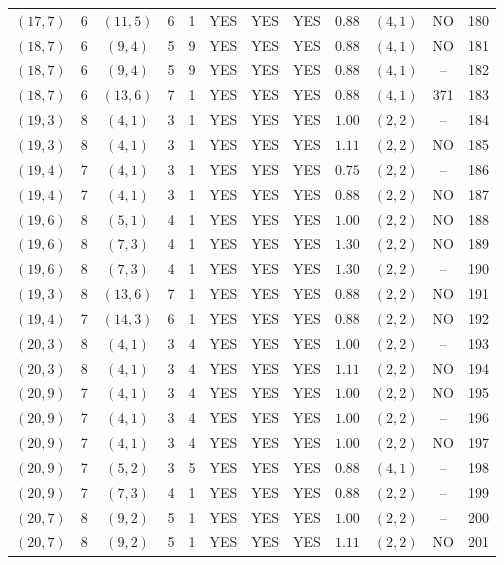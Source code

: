 \begin{longtable}{|c|c|c|c|c|c|c|c|c|c|c|c|}
$(17,7)$ & 6 & $(11,5)$ & 6 & 1 & YES & YES & YES & $0.88$ & $(4,1)$ & NO & 180\\
$(18,7)$ & 6 & $(9,4)$ & 5 & 9 & YES & YES & YES & $0.88$ & $(4,1)$ & NO & 181\\
$(18,7)$ & 6 & $(9,4)$ & 5 & 9 & YES & YES & YES & $0.88$ & $(4,1)$ & -- & 182\\
$(18,7)$ & 6 & $(13,6)$ & 7 & 1 & YES & YES & YES & $0.88$ & $(4,1)$ & 371 & 183\\
$(19,3)$ & 8 & $(4,1)$ & 3 & 1 & YES & YES & YES & $1.00$ & $(2,2)$ & -- & 184\\
$(19,3)$ & 8 & $(4,1)$ & 3 & 1 & YES & YES & YES & $1.11$ & $(2,2)$ & NO & 185\\
$(19,4)$ & 7 & $(4,1)$ & 3 & 1 & YES & YES & YES & $0.75$ & $(2,2)$ & -- & 186\\
$(19,4)$ & 7 & $(4,1)$ & 3 & 1 & YES & YES & YES & $0.88$ & $(2,2)$ & NO & 187\\
$(19,6)$ & 8 & $(5,1)$ & 4 & 1 & YES & YES & YES & $1.00$ & $(2,2)$ & NO & 188\\
$(19,6)$ & 8 & $(7,3)$ & 4 & 1 & YES & YES & YES & $1.30$ & $(2,2)$ & NO & 189\\
$(19,6)$ & 8 & $(7,3)$ & 4 & 1 & YES & YES & YES & $1.30$ & $(2,2)$ & -- & 190\\
$(19,3)$ & 8 & $(13,6)$ & 7 & 1 & YES & YES & YES & $0.88$ & $(2,2)$ & NO & 191\\
$(19,4)$ & 7 & $(14,3)$ & 6 & 1 & YES & YES & YES & $0.88$ & $(2,2)$ & NO & 192\\
$(20,3)$ & 8 & $(4,1)$ & 3 & 4 & YES & YES & YES & $1.00$ & $(2,2)$ & -- & 193\\
$(20,3)$ & 8 & $(4,1)$ & 3 & 4 & YES & YES & YES & $1.11$ & $(2,2)$ & NO & 194\\
$(20,9)$ & 7 & $(4,1)$ & 3 & 4 & YES & YES & YES & $1.00$ & $(2,2)$ & NO & 195\\
$(20,9)$ & 7 & $(4,1)$ & 3 & 4 & YES & YES & YES & $1.00$ & $(2,2)$ & -- & 196\\
$(20,9)$ & 7 & $(4,1)$ & 3 & 4 & YES & YES & YES & $1.00$ & $(2,2)$ & NO & 197\\
$(20,9)$ & 7 & $(5,2)$ & 3 & 5 & YES & YES & YES & $0.88$ & $(4,1)$ & -- & 198\\
$(20,9)$ & 7 & $(7,3)$ & 4 & 1 & YES & YES & YES & $0.88$ & $(2,2)$ & -- & 199\\
$(20,7)$ & 8 & $(9,2)$ & 5 & 1 & YES & YES & YES & $1.00$ & $(2,2)$ & -- & 200\\
$(20,7)$ & 8 & $(9,2)$ & 5 & 1 & YES & YES & YES & $1.11$ & $(2,2)$ & NO & 201\\

\end{longtable}
